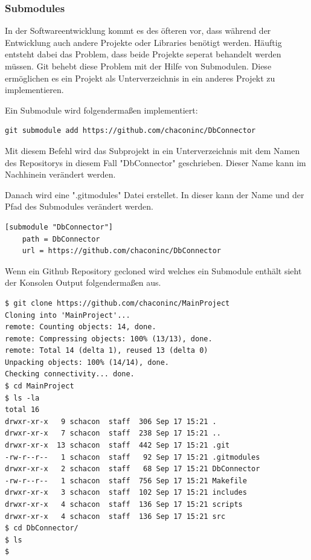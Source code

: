 \subsubsection{Submodules}

In der Softwareentwicklung kommt es des öfteren vor, dass während der Entwicklung auch andere Projekte oder Libraries benötigt werden. Häuftig entsteht dabei das Problem, dass beide Projekte seperat behandelt werden müssen. Git behebt diese Problem mit der Hilfe von Submodulen. Diese ermöglichen es ein Projekt als Unterverzeichnis in ein anderes Projekt zu implementieren.

Ein Submodule wird folgendermaßen implementiert:

\begin{lstlisting}
git submodule add https://github.com/chaconinc/DbConnector
\end{lstlisting}

Mit diesem Befehl wird das Subprojekt in ein Unterverzeichnis mit dem Namen des Repositorys in diesem Fall "DbConnector" geschrieben. Dieser Name kann im Nachhinein verändert werden.

Danach wird eine ".gitmodules" Datei erstellet. In dieser kann der Name und der Pfad des Submodules verändert werden.
\begin{lstlisting}
[submodule "DbConnector"]
	path = DbConnector
	url = https://github.com/chaconinc/DbConnector
\end{lstlisting}

Wenn ein Github Repository gecloned wird welches ein Submodule enthält sieht der Konsolen Output folgendermaßen aus. 
\begin{lstlisting}
$ git clone https://github.com/chaconinc/MainProject
Cloning into 'MainProject'...
remote: Counting objects: 14, done.
remote: Compressing objects: 100% (13/13), done.
remote: Total 14 (delta 1), reused 13 (delta 0)
Unpacking objects: 100% (14/14), done.
Checking connectivity... done.
$ cd MainProject
$ ls -la
total 16
drwxr-xr-x   9 schacon  staff  306 Sep 17 15:21 .
drwxr-xr-x   7 schacon  staff  238 Sep 17 15:21 ..
drwxr-xr-x  13 schacon  staff  442 Sep 17 15:21 .git
-rw-r--r--   1 schacon  staff   92 Sep 17 15:21 .gitmodules
drwxr-xr-x   2 schacon  staff   68 Sep 17 15:21 DbConnector
-rw-r--r--   1 schacon  staff  756 Sep 17 15:21 Makefile
drwxr-xr-x   3 schacon  staff  102 Sep 17 15:21 includes
drwxr-xr-x   4 schacon  staff  136 Sep 17 15:21 scripts
drwxr-xr-x   4 schacon  staff  136 Sep 17 15:21 src
$ cd DbConnector/
$ ls
$
\end{lstlisting}

